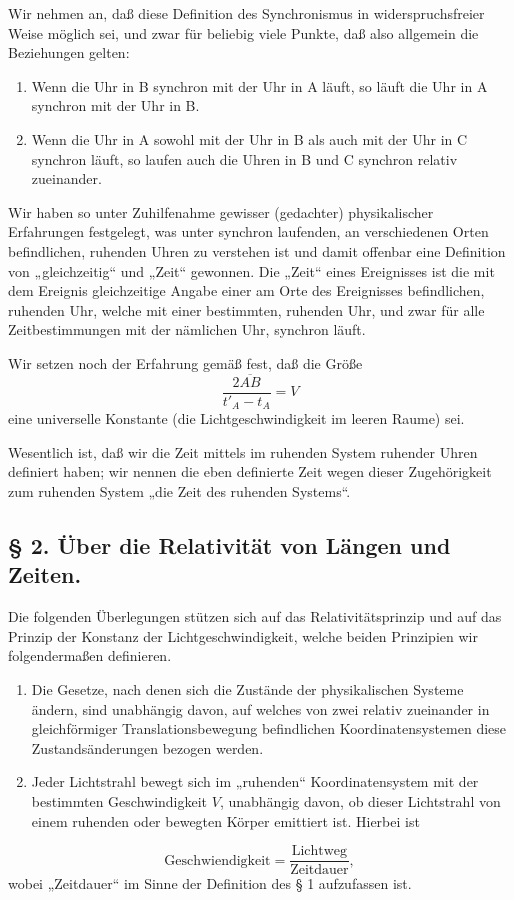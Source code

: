 \documentclass[17pt]{webarticle}       %
\begin{document}
Wir nehmen an, daß diese Definition des Synchronismus in widerspruchsfreier Weise möglich sei, und zwar für beliebig viele Punkte, daß also allgemein die Beziehungen gelten:
\begin{enumerate}
\item Wenn die Uhr in B synchron mit der Uhr in A läuft, so läuft die Uhr in A synchron mit der Uhr in B.
\item Wenn die Uhr in A sowohl mit der Uhr in B als auch mit der Uhr in C synchron läuft, so laufen auch die Uhren in B und C synchron relativ zueinander.
\end{enumerate}

Wir haben so unter Zuhilfenahme gewisser (gedachter) physikalischer Erfahrungen festgelegt, was unter synchron laufenden, an verschiedenen Orten befindlichen, ruhenden Uhren zu verstehen ist und damit offenbar eine Definition von „gleichzeitig“ und „Zeit“ gewonnen. Die „Zeit“ eines Ereignisses ist die mit dem Ereignis gleichzeitige Angabe einer am Orte des Ereignisses befindlichen, ruhenden Uhr, welche mit einer bestimmten, ruhenden Uhr, und zwar für alle Zeitbestimmungen mit der nämlichen Uhr, synchron läuft.

Wir setzen noch der Erfahrung gemäß fest, daß die Größe
\[
\frac{2 \overline{A B}}{t'_A - t_A} = V
\]
eine universelle Konstante (die Lichtgeschwindigkeit im leeren Raume) sei.

Wesentlich ist, daß wir die Zeit mittels im ruhenden System ruhender Uhren definiert haben; wir nennen die eben definierte Zeit wegen dieser Zugehörigkeit zum ruhenden System „die Zeit des ruhenden Systems“.

\subsection*{§ 2. Über die Relativität von Längen und Zeiten.}

Die folgenden Überlegungen stützen sich auf das Relativitätsprinzip und auf das Prinzip der Konstanz der Lichtgeschwindigkeit, welche beiden Prinzipien wir folgendermaßen definieren.
\begin{enumerate}
\item Die Gesetze, nach denen sich die Zustände der physikalischen Systeme ändern, sind unabhängig davon, auf welches von zwei relativ zueinander in gleichförmiger Translationsbewegung befindlichen Koordinatensystemen diese Zustandsänderungen bezogen werden.
\item Jeder Lichtstrahl bewegt sich im „ruhenden“ Koordinatensystem mit der bestimmten Geschwindigkeit $V$, unabhängig davon, ob dieser Lichtstrahl von einem ruhenden oder bewegten Körper emittiert ist. Hierbei ist
\end{enumerate}
\[
\text{Geschwiendigkeit} = \frac{\text{Lichtweg}}{\text{Zeitdauer}} ,
\]
wobei „Zeitdauer“ im Sinne der Definition des § 1 aufzufassen ist.
\end{document}
